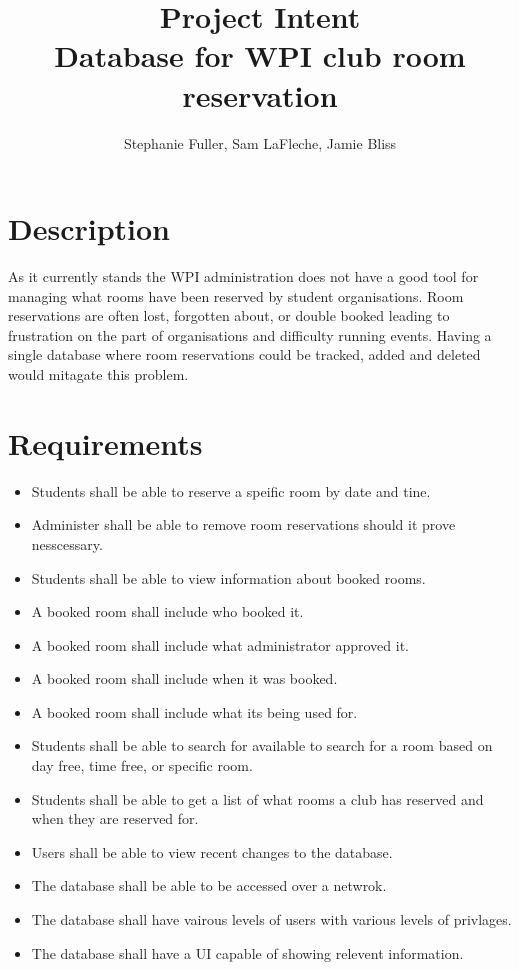 \documentclass{article}
\title{Project Intent\\Database for WPI club room reservation}
\author{Stephanie Fuller, Sam LaFleche, Jamie Bliss}
\begin{document}
\maketitle

\section{Description}
As it currently stands the WPI administration does not have a good tool for
managing what rooms have been reserved by student organisations. Room
reservations are often lost, forgotten about, or double booked leading to
frustration on the part of organisations and difficulty running events. Having a
single database where room reservations could be tracked, added and deleted
would mitagate this problem.

\section{Requirements}
\begin{itemize}
\item 
Students shall be able to reserve a speific room by date and tine.
\item
Administer shall be able to remove room reservations should it prove
nesscessary.
\item
Students shall be able to view information about booked rooms.
\item
A booked room shall include who booked it.
\item A booked room shall include what administrator approved it.
\item A booked room shall include when it was booked.
\item A booked room shall include what its being used for.
\item
Students shall be able to search for available to search for a room based on day
free, time free, or specific room.
\item
Students shall be able to get a list of what rooms a club has reserved and when
they are reserved for.
\item
Users shall be able to view recent changes to the database.
\item
The database shall be able to be accessed over a netwrok.
\item
The database shall have vairous levels of users with various levels of
privlages.
\item
The database shall have a UI capable of showing relevent information.
\end{itemize}

%
\end{document}
